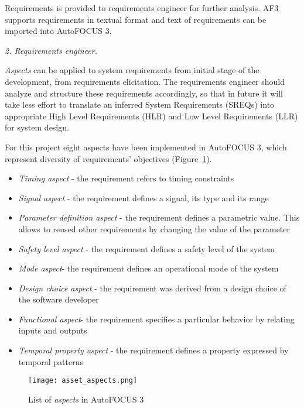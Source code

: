 Requirements is provided to requirements engineer for further analysis. AF3 supports requirements in textual format and text of requirements can be imported into AutoFOCUS 3. 

\textit{2. Requirements engineer.}

\textit{Aspects} can be applied to system requirements from initial stage of the development, from requirements elicitation. The requirements engineer should analyze and structure these requirements accordingly, so that in future it will take less effort to translate an inferred System Requirements (SREQs) into appropriate High Level Requirements (HLR) and Low Level Requirements (LLR) for system design.

For this project eight aspects have been implemented in AutoFOCUS 3, which represent diversity of requirements' objectives (Figure~\ref{fig:fig_aspects}).

\begin{itemize}
\item	\textit{Timing aspect} - the requirement refers to timing constraints
\item	\textit{Signal aspect} - the requirement defines a signal, its type and its range
\item	\textit{Parameter definition aspect} - the requirement defines a parametric value. This allows to reused other requirements by changing the value of the parameter
\item\textit{Safety level aspect} - the requirement defines a safety level of the system
\item	\textit{Mode aspect}- the requirement defines an operational mode of the system
\item	\textit{Design choice aspect} - the requirement was derived from a design choice of the software developer
\item	\textit{Functional aspect}- the requirement specifies a particular behavior by relating inputs and outputs
\item	\textit{Temporal property aspect} - the requirement defines a property expressed by temporal patterns
\end{itemize}

\begin{figure}[!t]
\centering
\texttt{[image: asset\_aspects.png]}
\caption{List of \textit{aspects} in AutoFOCUS 3}
\label{fig:fig_aspects}
\end{figure}

